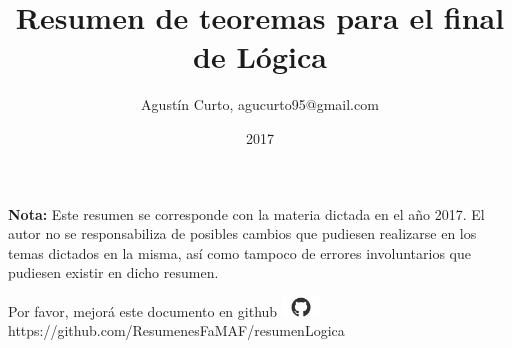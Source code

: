 \documentclass[12pt,a4paper]{article}
\author{Agustín Curto, agucurto95@gmail.com}
\title{Resumen de teoremas para el final \\ de Lógica}
\date{2017}
\newcommand{\PN}{\par\noindent}
\begin{document}
	\clearpage\maketitle
	\thispagestyle{empty}
	\tableofcontents

	\vspace{5cm}
	\PN \textbf{Nota:} Este resumen se corresponde con la materia dictada en el año 2017. El autor no se
	responsabiliza de posibles cambios que pudiesen realizarse en los temas dictados en la misma, así como tampoco de
	errores involuntarios que pudiesen existir en dicho resumen.

	\vspace{\fill}
	\begin{center}
		Por favor, mejorá este documento en github
		\includegraphics[width=1cm]{graphics/github.png} \\
		https://github.com/ResumenesFaMAF/resumenLogica
	\end{center}

	\pagebreak

	
	
	
	
	
\end{document}
